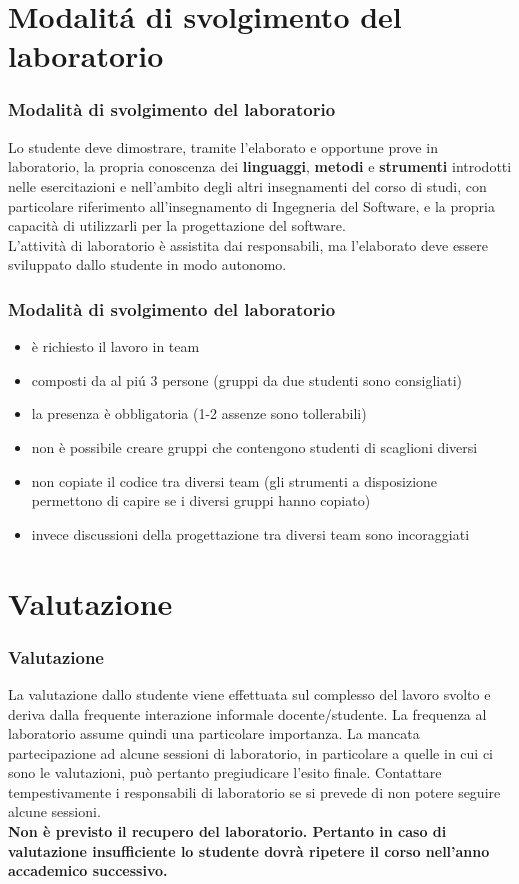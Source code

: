 \documentclass{beamer}
\begin{document}
\section{Modalit\' a di svolgimento del laboratorio}
\begin{frame}
\frametitle{Modalit\` a di svolgimento del laboratorio}


 Lo studente deve dimostrare, tramite l'elaborato e opportune prove in
 laboratorio, la propria conoscenza dei \textbf{linguaggi},
 \textbf{metodi} e \textbf{strumenti} introdotti nelle esercitazioni e
 nell'ambito degli altri insegnamenti del corso di studi, con
 particolare riferimento all'insegnamento di Ingegneria del Software,
 e la propria capacit\` a di utilizzarli per la progettazione del
 software.\\

 L'attivit\` a di laboratorio \`e assistita dai responsabili, ma
 l'elaborato deve essere sviluppato dallo studente in modo autonomo.
\end{frame}


\begin{frame}
\frametitle{Modalit\` a di svolgimento del laboratorio}
\begin{itemize}
\item \` e richiesto il lavoro in team
\item composti da al pi\' u 3 persone
  (gruppi da due studenti sono consigliati)
\item la presenza \`e obbligatoria (1-2 assenze sono tollerabili) 
\item non \` e possibile creare gruppi che contengono studenti di scaglioni diversi
\item non copiate il codice tra diversi team (gli strumenti a disposizione
  permettono di capire se i diversi gruppi hanno copiato)
\item invece discussioni della progettazione tra diversi team sono incoraggiati
\end{itemize}
\end{frame}

\section{Valutazione}
\begin{frame}
\frametitle{Valutazione}
La valutazione dallo studente viene effettuata sul complesso del lavoro svolto e deriva dalla frequente interazione informale docente/studente. La frequenza al laboratorio assume quindi una particolare importanza. La mancata partecipazione ad alcune sessioni di laboratorio, in particolare a quelle in cui ci sono le valutazioni, pu\` o pertanto pregiudicare l'esito finale. Contattare tempestivamente i responsabili di laboratorio se si prevede di non potere seguire alcune sessioni.\\

\textbf{Non \`e previsto il recupero del laboratorio. Pertanto in caso di valutazione insufficiente lo studente dovr\`a ripetere il corso nell'anno accademico successivo.}
\end{frame}
\end{document}
